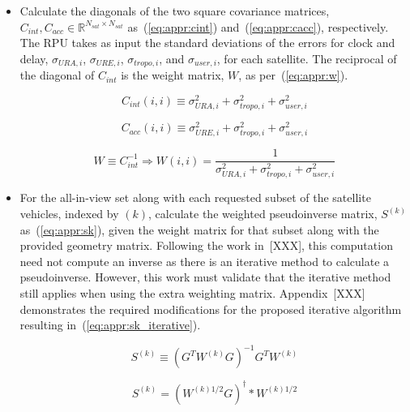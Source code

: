 \documentclass[11pt]{article}
\begin{document}
\begin{itemize}

\item Calculate the diagonals of the two square covariance matrices, $C_{int}, C_{acc} \in \mathbb{R}^{N_{sat} \times N_{sat}}$ as~(\ref{eq:appr:cint}) and~(\ref{eq:appr:cacc}), respectively. The RPU takes as input the standard deviations of the errors for clock and delay, $\sigma_{URA,i}$, $\sigma_{URE,i}$, $\sigma_{tropo,i}$, and $\sigma_{user,i}$, for each satellite. The reciprocal of the diagonal of $C_{int}$ is the weight matrix, $W$, as per~(\ref{eq:appr:w}).

\begin{equation}
    \label{eq:appr:cint}
    C_{int}(i,i) \equiv \sigma_{URA,i}^2 + \sigma_{tropo,i}^2 + \sigma_{user,i}^2
\end{equation}

\begin{equation}
    \label{eq:appr:cacc}
    C_{acc}(i,i) \equiv \sigma_{URE,i}^2 + \sigma_{tropo,i}^2 + \sigma_{user,i}^2
\end{equation}

\begin{equation}
    \label{eq:appr:w}
    W \equiv C_{int}^{-1} \Rightarrow W(i,i)=\frac{1}{\sigma_{URA,i}^2 + \sigma_{tropo,i}^2 + \sigma_{user,i}^2}
\end{equation}

\item For the all-in-view set along with each requested subset of the satellite vehicles, indexed by $(k)$, calculate the weighted pseudoinverse matrix, $S^{(k)}$ as~(\ref{eq:appr:sk}), given the weight matrix for that subset along with the provided geometry matrix. Following the work in~[XXX], this computation need not compute an inverse as there is an iterative method to calculate a pseudoinverse. However, this work must validate that the iterative method still applies when using the extra weighting matrix. Appendix~[XXX] demonstrates the required modifications for the proposed iterative algorithm resulting in~(\ref{eq:appr:sk_iterative}).

\begin{equation}
    \label{eq:appr:sk}
    S^{(k)} \equiv (G^T W^{(k)} G)^{-1} G^T W^{(k)}
\end{equation}

\begin{equation}
    \label{eq:appr:sk_iterative}
    S^{(k)} = (W^{(k)1/2} G)^{\dagger} * W^{(k)1/2}
\end{equation}


\end{itemize}
\end{document}
